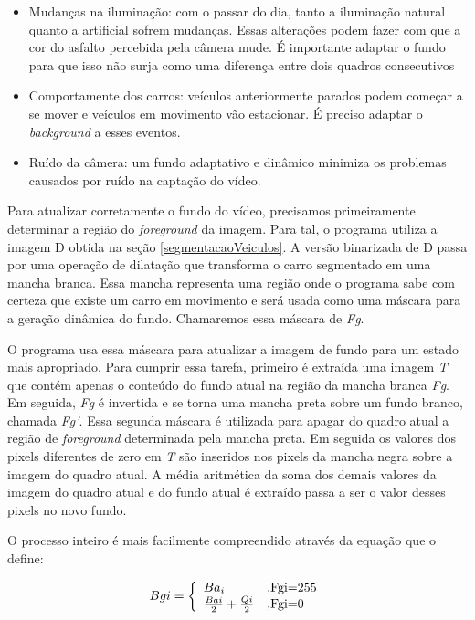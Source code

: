      \begin{itemize}
       \item Mudanças na iluminação: com o passar do dia, tanto a iluminação natural quanto a artificial sofrem mudanças. Essas alterações podem fazer com que a cor do asfalto percebida pela câmera mude. É importante adaptar o fundo para que isso não surja como uma diferença entre dois quadros consecutivos
       \item Comportamente dos carros: veículos anteriormente parados podem começar a se mover e veículos em movimento vão estacionar. É preciso adaptar o \textit{background} a esses eventos.
       \item Ruído da câmera: um fundo adaptativo e dinâmico minimiza os problemas causados por ruído na captação do vídeo.
     \end{itemize}

     Para atualizar corretamente o fundo do vídeo, precisamos primeiramente determinar a região do \textit{foreground} da imagem. Para tal, o programa utiliza a imagem D obtida na seção \ref{segmentacaoVeiculos}. A versão binarizada de D passa por uma operação de dilatação que transforma o carro segmentado em uma mancha branca. Essa mancha representa uma região onde o programa sabe com certeza que existe um carro em movimento e será usada como uma máscara para a geração dinâmica do fundo. Chamaremos essa máscara de \textit{Fg}.

     O programa usa essa máscara para atualizar a imagem de fundo para um estado mais apropriado. Para cumprir essa tarefa, primeiro é extraída uma imagem \textit{T} que contém apenas o conteúdo do fundo atual na região da mancha branca \textit{Fg}. Em seguida, \textit{Fg} é invertida e se torna uma mancha preta sobre um fundo branco, chamada \textit{Fg'}. Essa segunda máscara é utilizada para apagar do quadro atual a região de \textit{foreground} determinada pela mancha preta. Em seguida os valores dos pixels diferentes de zero em \textit{T} são inseridos nos pixels da mancha negra sobre a imagem do quadro atual. A média aritmética da soma dos demais valores da imagem do quadro atual e do fundo atual é extraído passa a ser o valor desses pixels no novo fundo.

     O processo inteiro é mais facilmente compreendido através da equação que o define:

     \begin{equation}\label{geracaoFundoEquacao}
       Bgi = \left\{
        \begin{array}{l l}
        Ba_{i} & \text{,Fgi=255} \\
        \frac{Bai}{2} + \frac{Qi}{2} & \text{,Fgi=0}\\
         \end{array} \right.
     \end{equation}

